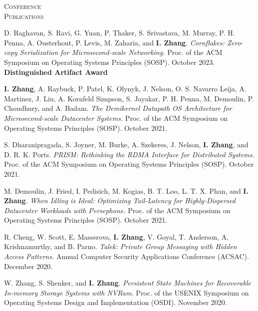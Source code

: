 \documentclass[10pt,times]{report}
\newlength{\sectiongap}
\newlength{\sectioncolwidth}
\newlength{\colgap}
\newlength{\stuffwidth}
\newenvironment{rtable}{
  \begin{minipage}{\textwidth}
  }{
  \end{minipage}
}
\newenvironment{rsection}[1]{
  \begin{minipage}[t]{\sectioncolwidth}
    \textsc{#1}
  \end{minipage}
  \hspace{\colgap}
  \begin{minipage}[t]{\stuffwidth}
  }{
    \removelastskip
  \end{minipage}
  \\[\sectiongap]
}
\begin{document}
\begin{rtable}
  
  \begin{rsection}{Conference\\Publications}
    D. Raghavan, S. Ravi, G. Yuan, P. Thaker, S. Srivastava,
    M. Murray, P. H. Penna, A. Ousterhout, P. Levis, M. Zaharia, and
    \textbf{I. Zhang}.  \textit{Cornflakes: Zero-copy Serialization
      for Microsecond-scale Networking.}  Proc. of the ACM Symposium
    on Operating Systems Principles (SOSP). October
    2023. \textbf{Distinguished Artifact Award} \\\vspace{-0.5em}

    \textbf{I. Zhang}, A. Raybuck, P. Patel, K. Olynyk, J. Nelson,
    O. S. Navarro Leija, A. Martinez, J. Liu, A. Kornfeld Simpson,
    S. Jayakar, P. H.  Penna, M. Demoulin, P. Choudhury, and
    A. Badam. \textit{The Demikernel Datapath OS Architecture for
      Microsecond-scale Datacenter Systems.  } Proc. of the ACM
    Symposium on Operating Systems Principles (SOSP). October
    2021. \\\vspace{-0.5em}

    S. Dharanipragada, S. Joyner, M. Burke, A.  Szekeres, J. Nelson,
    \textbf{I. Zhang}, and D. R. K. Ports. \textit{PRISM: Rethinking
      the RDMA Interface for Distributed Systems.}  Proc. of the
    ACM Symposium on Operating Systems Principles (SOSP). October
    2021. \\\vspace{-0.5em}

    M. Demoulin, J. Fried, I. Pedisich, M. Kogias, B. T. Loo,
    L. T. X. Phan, and \textbf{I. Zhang}. \textit{When Idling is
      Ideal: Optimizing Tail-Latency for Highly-Dispersed Datacenter
      Workloads with Persephone.  } Proc. of the ACM Symposium
    on Operating Systems Principles (SOSP). October
    2021. \\\vspace{-0.5em}

    R. Cheng, W. Scott, E. Masserova, \textbf{I. Zhang}, V. Goyal,
    T. Anderson, A. Krishnamurthy, and B. Parno. \textit{Talek:
      Private Group Messaging with Hidden Access Patterns.} Annual
    Computer Security Applications Conference (ACSAC). December
    2020. \\\vspace{-0.5em}

    W. Zhang, S. Shenker, and \textbf{I. Zhang}.  \textit{Persistent
      State Machines for Recoverable In-memory Storage Systems with
      NVRam.}  Proc. of the USENIX Symposium on Operating
    Systems Design and Implementation (OSDI). November
    2020. \\\vspace{-0.5em}
    

\end{rsection}
\end{rtable}
\end{document}
